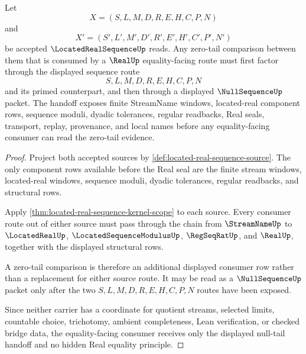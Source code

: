 \begin{theorem}
\label{thm:located-real-sequence-null-tail-handoff}
Let
$$
X=(S,L,M,D,R,E,H,C,P,N)
$$
and
$$
X'=(S',L',M',D',R',E',H',C',P',N')
$$
be accepted $\LocatedRealSequenceUp$ reads. Any zero-tail comparison between them that is consumed by a $\RealUp$ equality-facing route must first factor through the displayed sequence route
$$
S,L,M,D,R,E,H,C,P,N
$$
and its primed counterpart, and then through a displayed $\NullSequenceUp$ packet. The handoff exposes finite StreamName windows, located-real component rows, sequence moduli, dyadic tolerances, regular readbacks, Real seals, transport, replay, provenance, and local names before any equality-facing consumer can read the zero-tail evidence.
\end{theorem}
\begin{proof}
Project both accepted sources by \autoref{def:located-real-sequence-source}. The only component rows available before the Real seal are the finite stream windows, located-real windows, sequence moduli, dyadic tolerances, regular readbacks, and structural rows.

Apply \autoref{thm:located-real-sequence-kernel-scope} to each source. Every consumer route out of either source must pass through the chain from $\StreamNameUp$ to $\LocatedRealUp$, $\LocatedSequenceModulusUp$, $\RegSeqRatUp$, and $\RealUp$, together with the displayed structural rows.

A zero-tail comparison is therefore an additional displayed consumer row rather than a replacement for either source route. It may be read as a $\NullSequenceUp$ packet only after the two $S,L,M,D,R,E,H,C,P,N$ routes have been exposed.

Since neither carrier has a coordinate for quotient streams, selected limits, countable choice, trichotomy, ambient completeness, Lean verification, or checked bridge data, the equality-facing consumer receives only the displayed null-tail handoff and no hidden Real equality principle.
\end{proof}


